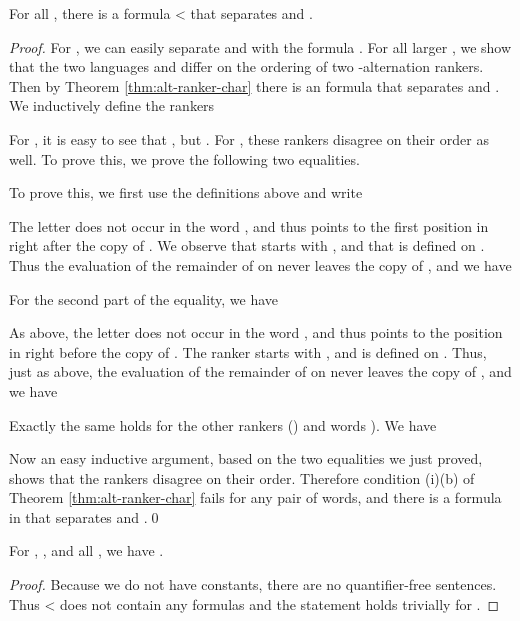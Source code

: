 \documentclass{LMCS}
\newcommand{\qedconf}{}
\renewcommand{\qedconf}{\qed}
\begin{document}
\begin{full}

\begin{lem} 
  \label{lem:alt-hierarchy-exp}
  For all , there is a formula < that
  separates  and . 
\end{lem}

\begin{proof}
  For , we can easily separate  and  with the formula .
  For all larger , we show that the two languages  and  differ on
  the ordering of two -alternation rankers. Then by Theorem
  \ref{thm:alt-ranker-char} there is an  formula that
  separates  and . We inductively define the rankers
  

  For , it is easy to see that , but
  . For , these rankers disagree on
  their order as well. To prove this, we prove the following two equalities.
  
  To prove this, we first use the definitions above and write
  
  The letter  does not occur in the word ,
  and thus  points to the first
  position in  right after the copy of . We observe
  that  starts with , and that  is defined on
  . Thus the evaluation of the remainder of  on
   never leaves the copy of , and we have
  
  For the second part of the equality, we have
  
  As above, the letter  does not occur in the word
  , and thus  points to the
  position in  right before the copy of . The ranker
   starts with , and  is defined on .
  Thus, just as above, the evaluation of the remainder of  on
   never leaves the copy of , and we have
  
  Exactly the same holds for the other rankers () and words
  ). We have
  

  Now an easy inductive argument, based on the two equalities we just
  proved, shows that the rankers disagree on their order. Therefore
  condition (i)(b) of Theorem \ref{thm:alt-ranker-char} fails for any pair
  of words, and there is a formula in  that separates
   and .\qedconf
\end{proof}\pagebreak[2]

\begin{lem} 
  \label{lem:alt-hierarchy-nexp}
  For , ,
  and all , we have .
\end{lem}

\begin{proof}
  Because we do not have constants, there are no quantifier-free sentences.
  Thus < 
  does not contain any formulas and the statement holds
  trivially for .


\end{proof}
\end{full}
\end{document}

